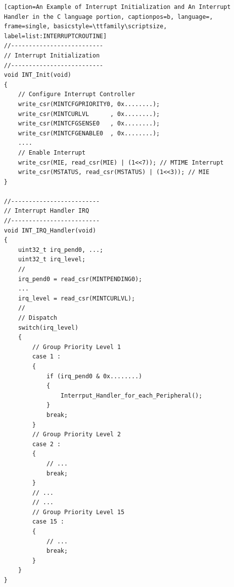 \begin{lstlisting}[caption=An Example of Interrupt Initialization and An Interrupt Handler in the C language portion, captionpos=b, language=, frame=single, basicstyle=\ttfamily\scriptsize, label=list:INTERRUPTCROUTINE]
//--------------------------
// Interrupt Initialization
//--------------------------
void INT_Init(void)
{
    // Configure Interrupt Controller
    write_csr(MINTCFGPRIORITY0, 0x........);
    write_csr(MINTCURLVL      , 0x........);
    write_csr(MINTCFGSENSE0   , 0x........);
    write_csr(MINTCFGENABLE0  , 0x........);
    ....
    // Enable Interrupt
    write_csr(MIE, read_csr(MIE) | (1<<7)); // MTIME Interrupt
    write_csr(MSTATUS, read_csr(MSTATUS) | (1<<3)); // MIE
}

//-------------------------
// Interrupt Handler IRQ
//-------------------------
void INT_IRQ_Handler(void)
{
    uint32_t irq_pend0, ...;
    uint32_t irq_level;
    //
    irq_pend0 = read_csr(MINTPENDING0);
    ...
    irq_level = read_csr(MINTCURLVL);
    //
    // Dispatch
    switch(irq_level)
    {
        // Group Priority Level 1
        case 1 :
        {
            if (irq_pend0 & 0x........)
            {
                Interrput_Handler_for_each_Peripheral();
            }
            break;
        }
        // Group Priority Level 2
        case 2 :
        {
            // ...
            break;
        }
        // ...
        // ...
        // Group Priority Level 15
        case 15 :
        {
            // ...
            break;
        }
    }
}
\end{lstlisting}
